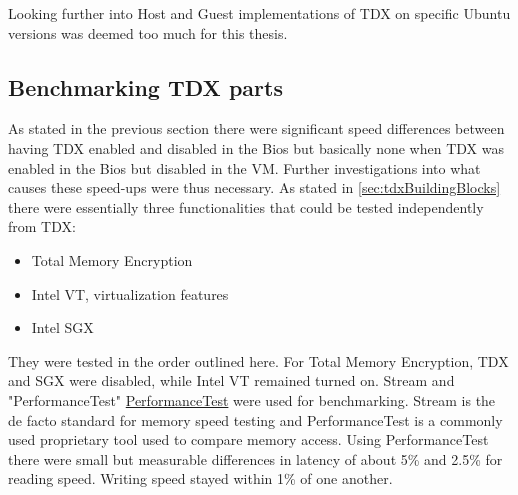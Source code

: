 Looking further into Host and Guest implementations of TDX on specific Ubuntu versions was deemed too much for this thesis.

\subsection{Benchmarking TDX parts}

As stated in the previous section there were significant speed differences between having TDX enabled and disabled in the Bios but basically none when TDX was enabled in the Bios but disabled in the VM. Further investigations into what causes these speed-ups were thus necessary. As stated in \ref{sec:tdxBuildingBlocks} there were essentially three functionalities that could be tested independently from TDX:
\begin{itemize}
    \item Total Memory Encryption 
    \item Intel VT, virtualization features
    \item Intel SGX
\end{itemize}

They were tested in the order outlined here.
For Total Memory Encryption, TDX and SGX were disabled, while Intel VT remained turned on. Stream \cite{Stream} and "PerformanceTest" \url{PerformanceTest} were used for benchmarking. Stream is the de facto standard for memory speed testing and PerformanceTest is a commonly used proprietary tool used to compare memory access. Using PerformanceTest there were small but measurable differences in latency of about 5\% and 2.5\% for reading speed. Writing speed stayed within 1\% of one another.
\begin{table}
\centering
{}
\caption{Results of Performancetests memory benchmark}
\label{tab:MemoryAccessSpeed}
\end{table}

